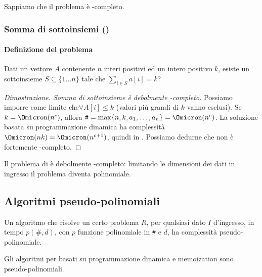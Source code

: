 Sappiamo che il problema {\subSetSumProblem} è \NP-completo.

\subsubsection{Somma di sottoinsiemi (\subSetSumProblem)}

\paragraph{Definizione del problema}
Dati un vettore \(A\) contenente \(n\) interi positivi ed un intero positivo \(k\), \alert{esiste} un sottoinsieme \(S \subseteq \{1 \dots n\}\) tale che \(\sum_{i \in S} a[i] = k\)?

\begin{proof}[Dimostrazione. Somma di sottoinsieme è debolmente \NP-completo]
Possiamo imporre come limite che\newline \(\forall A[i] \leqslant k\) (valori più grandi di \(k\) vanno esclusi).
Se \(k = \Omicron(n^c)\), allora \(\texttt{\#} = \max\{n, k, a_1, \dots, a_n\} = \Omicron(n^c)\).
La soluzione basata su programmazione dinamica ha complessità \(\Omicron(nk) = \Omicron(n^{c+1})\), quindi in {\PTIME}.
Possiamo dedurne che {\subSetSumProblem} non è fortemente \NP-completo.
\end{proof}

\begin{note}
Il problema di {\subSetSumProblem} è debolmente \NP-completo: limitando le dimensioni dei dati in ingresso il problema diventa polinomiale.
\end{note}

\subsection{Algoritmi pseudo-polinomiali}

\begin{definition}
Un algoritmo che risolve un certo problema \(R\), per qualsiasi dato \(I\) d'ingresso, in tempo \(p(\texttt{\#},d)\), con \(p\) funzione polinomiale in \texttt{\#} e \(d\), ha complessità \alert{pseudo-polinomiale}.
\end{definition}

\begin{observation}
Gli algoritmi per {\subSetSumProblem} basati su programmazione dinamica e memoization sono pseudo-polinomiali.
\end{observation}

